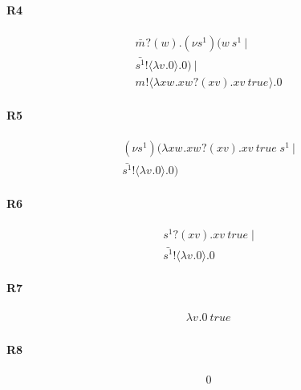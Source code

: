 \documentclass{article}
\begin{document}
\paragraph{R4}
\begin{align*}
\bar{m_{}}?(w).(\nu s^{1}_{})(w \ s^{1}_{} \ | \\ \bar{s^{1}_{}}! \langle  \lambda v_{}.0  \rangle.0 )  \ | \\ m_{}! \langle  \lambda xw_{}.xw_{}?(xv).xv \ true_{} \rangle.0 
\end{align*}
\paragraph{R5}
\begin{align*}
(\nu s^{1}_{})(\lambda xw_{}.xw_{}?(xv).xv \ true_{} \ s^{1}_{} \ | \\ \bar{s^{1}_{}}! \langle  \lambda v_{}.0  \rangle.0 ) 
\end{align*}
\paragraph{R6}
\begin{align*}
s^{1}_{}?(xv).xv \ true_{} \ | \\ \bar{s^{1}_{}}! \langle  \lambda v_{}.0  \rangle.0 
\end{align*}
\paragraph{R7}
\begin{align*}
\lambda v_{}.0  \ true_{}
\end{align*}
\paragraph{R8}
\begin{align*}
0 
\end{align*}
\end{document}
